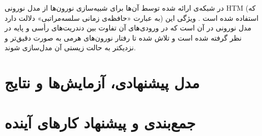 \documentclass[12pt]{report}
\begin{document}
در شبکه‌ی ارائه شده توسط آن‌ها برای شبیه‌سازی نورون‌ها از مدل نورونی HTM (که به عبارت «حافظه‌ی زمانی سلسه‌مراتبی» دلالت دارد) استفاده شده است \cite{HTM2011}.
ویژگی این مدل نورونی در آن است که در ورودی‌های آن تفاوت بین دندریت‌های رأسی و پایه در نظر گرفته شده است و تلاش شده تا رفتار نورون‌های هرمی به صورت دقیق‌تر و نزدیکتر به حالت زیستی آن مدل‌سازی شوند.
	
	\chapter{مدل پیشنهادی، آزمایش‌ها و نتایج}
	
	
	\chapter{جمع‌بندی و پیشنهاد کار‌های آینده}
	
	
	
	
	
	
	\printglossary[title=واژه‌نامه فارسی به انگلیسی, toctitle=واژه‌نامه فارسی به انگلیسی]
	
	
	\begin{latin}
		
		\renewcommand{\bibname}{\rl{{مراجع}\hfill}}
		
	\end{latin}
	
\end{document}
